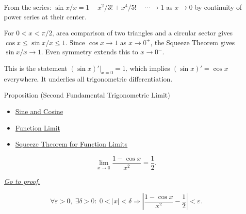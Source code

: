 \begin{remark*}
From the series: $\sin x / x = 1 - x^2/3! + x^4/5! - \cdots \to 1$
as $x \to 0$ by continuity of power series at their center.
\end{remark*}

\begin{remark*}
For $0 < x < \pi/2$, area comparison of two triangles and a circular
sector gives $\cos x \leq \sin x / x \leq 1$. Since $\cos x \to 1$
as $x \to 0^+$, the Squeeze Theorem gives $\sin x / x \to 1$.
Even symmetry extends this to $x \to 0^-$.
\end{remark*}

\begin{remark*}[Significance]
This is the statement $(\sin x)'\big|_{x=0} = 1$, which implies
$(\sin x)' = \cos x$ everywhere. It underlies all trigonometric
differentiation.
\end{remark*}


\begin{propositionbox}{Proposition (Second Fundamental Trigonometric Limit)}

\begin{dependencies}
\begin{itemize}
  \item \hyperref[def:sine-cosine]{Sine and Cosine}
  \item \hyperref[def:limit-function]{Function Limit}
  \item \hyperref[thm:squeeze-function-limits]{Squeeze Theorem for Function Limits}
\end{itemize}
\end{dependencies}
\begin{proposition}
\label{prop:limit-one-minus-cos}
\[
  \lim_{x \to 0} \frac{1 - \cos x}{x^2} = \frac{1}{2}.
\]

\smallskip\noindent
\hyperref[prf:limit-one-minus-cos]{\textit{Go to proof.}}
\end{proposition}
\end{propositionbox}\begin{remark*}
\[
  \forall\varepsilon>0,\;\exists\delta>0:\;
  0<|x|<\delta \Rightarrow
  \left|\frac{1-\cos x}{x^2}-\frac{1}{2}\right|<\varepsilon.
\]
\end{remark*}


